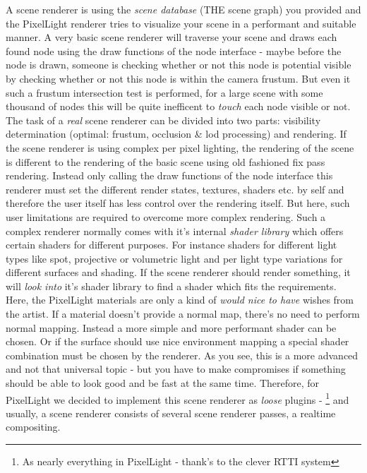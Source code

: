 A scene renderer is using the \emph{scene database} (THE scene graph) you provided and the PixelLight renderer tries to visualize your scene in a performant and suitable manner. A very basic scene renderer will traverse your scene and draws each found node using the draw functions of the node interface - maybe before the node is drawn, someone is checking whether or not this node is potential visible by checking whether or not this node is within the camera frustum. But even it such a frustum intersection test is performed, for a large scene with some thousand of nodes this will be quite inefficent to \emph{touch} each node visible or not. The task of a \emph{real} scene renderer can be divided into two parts: visibility determination (optimal: frustum, occlusion \& lod processing) and rendering. If the scene renderer is using complex per pixel lighting, the rendering of the scene is different to the rendering of the basic scene using old fashioned fix pass rendering. Instead only calling the draw functions of the node interface this renderer must set the different render states, textures, shaders etc. by self and therefore the user itself has less control over the rendering itself. But here, such user limitations are required to overcome more complex rendering. Such a complex renderer normally comes with it's internal \emph{shader library} which offers certain shaders for different purposes. For instance shaders for different light types like spot, projective or volumetric light and per light type variations for different surfaces and shading. If the scene renderer should render something, it will \emph{look into} it's shader library to find a shader which fits the requirements. Here, the PixelLight materials are only a kind of \emph{would nice to have} wishes from the artist. If a material doesn't provide a normal map, there's no need to perform normal mapping. Instead a more simple and more performant shader can be chosen. Or if the surface should use nice environment mapping a special shader combination must be chosen by the renderer. As you see, this is a more advanced and not that universal topic - but  you have to make compromises if something should be able to look good and be fast at the same time. Therefore, for PixelLight we decided to implement this scene renderer as \emph{loose} plugins - \footnote{As nearly everything in PixelLight - thank's to the clever RTTI system} and usually, a scene renderer consists of several scene renderer passes, a realtime compositing.

